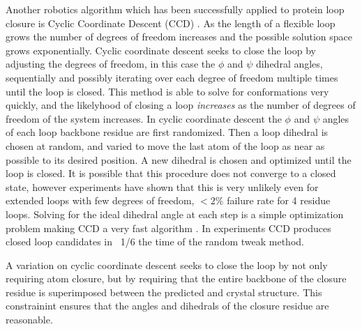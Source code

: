 Another robotics algorithm which has been successfully applied to protein loop closure is Cyclic Coordinate Descent (CCD) \cite{canutescu2003cyclic}.
As the length of a flexible loop grows the number of degrees of freedom increases and the possible solution space grows exponentially. 
Cyclic coordinate descent seeks to close the loop by adjusting the degrees of freedom, in this case the $\phi$ and $\psi$ dihedral angles, sequentially and possibly iterating over each degree of freedom multiple times until the loop is closed.
This method is able to solve for conformations very quickly, and the likelyhood of closing a loop {\it increases} as the number of degrees of freedom of the system increases.
In cyclic coordinate descent the $\phi$ and $\psi$ angles of each loop backbone residue are first randomized.
Then a loop dihedral is chosen at random, and varied to move the last atom of the loop as near as possible to its desired position.
A new dihedral is chosen and optimized until the loop is closed.
It is possible that this procedure does not converge to a closed state, however experiments have shown that this is very unlikely even for extended loops with few degrees of freedom, $ < 2\%$ failure rate for 4 residue loops.
Solving for the ideal dihedral angle at each step is a simple optimization problem making CCD a very fast algorithm \cite{wang1991combined,canutescu2003cyclic}.
In experiments CCD produces closed loop candidates in ~1/6 the time of the random tweak method.

A variation on cyclic coordinate descent seeks to close the loop by not only requiring atom closure, but by requiring that the entire backbone of the closure residue is superimposed between the predicted and crystal structure.
This constrainint ensures that the angles and dihedrals of the closure residue are reasonable\cite{canutescu2003cyclic}.
